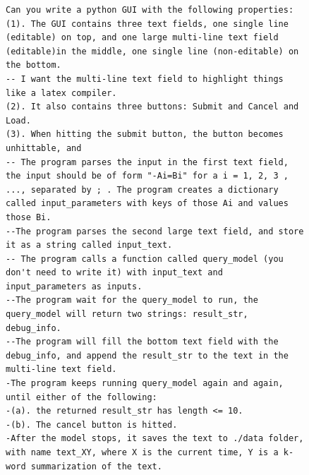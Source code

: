 \begin{figure}[H]
\begin{AIbox}{\DV}
\begin{verbatim}
Can you write a python GUI with the following properties:
(1). The GUI contains three text fields, one single line (editable) on top, and one large multi-line text field (editable)in the middle, one single line (non-editable) on the bottom.
-- I want the multi-line text field to highlight things like a latex compiler. 
(2). It also contains three buttons: Submit and Cancel and Load.
(3). When hitting the submit button, the button becomes unhittable, and 
-- The program parses the input in the first text field, the input should be of form "-Ai=Bi" for a i = 1, 2, 3 , ..., separated by ; . The program creates a dictionary called input_parameters with keys of those Ai and values those Bi.
--The program parses the second large text field, and store it as a string called input_text.  
-- The program calls a function called query_model (you don't need to write it) with input_text and input_parameters as inputs.
--The program wait for the query_model to run, the query_model will return two strings: result_str, debug_info.
--The program will fill the bottom text field with the debug_info, and append the result_str to the text in the multi-line text field. 
-The program keeps running query_model again and again, until either of the following:
-(a). the returned result_str has length <= 10.
-(b). The cancel button is hitted. 
-After the model stops, it saves the text to ./data folder, with name text_XY, where X is the current time, Y is a k-word summarization of the text.
\end{verbatim}

\end{AIbox}
\end{figure}
